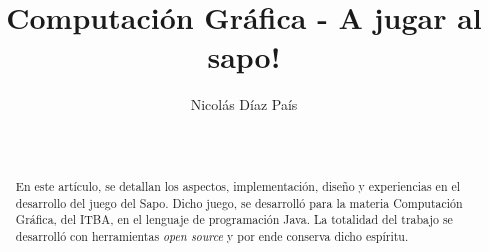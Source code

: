 \documentclass{acm_proc_article-sp}
\begin{document}
\title{Computaci\'on Gr\'afica - A jugar al sapo!}
%
%
%
%
%

%
\author{
%
%
\alignauthor Nicol\'as D\'iaz Pa\'is\\
       \\
	\\
       }


\maketitle
\begin{abstract}
En este art\'iculo, se detallan los aspectos, implementaci\'on, dise\~no y experiencias en el desarrollo del juego del Sapo. Dicho juego, 
se desarroll\'o para la materia Computaci\'on Gr\'afica, del ITBA, en el lenguaje de programaci\'on Java. La totalidad del trabajo se desarroll\'o con herramientas 
\textit{open source} y 
por ende conserva dicho esp\'iritu.
\end{abstract}
\end{document}
